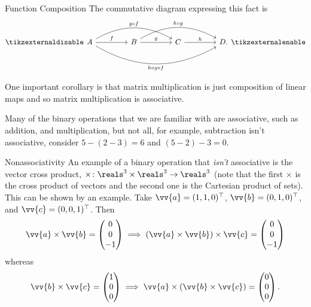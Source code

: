 \documentclass[fleqn]{NotesClass}
\newcommand*{\trans}{\top}
\begin{document}
\begin{exm}{Function Composition}{}
        The commutative diagram expressing this fact is
        \begin{equation}
            \tikzexternaldisable
            \begin{tikzcd}[column sep=1.5cm]
                A \ar[r, "f"] \ar[rr, "g \circ f", bend left] \ar[rrr, "h \circ g \circ f", bend right, swap] & B \ar[r, "g"] \ar[rr, "h \circ g", bend left] & C \ar[r, "h"] & D.
            \end{tikzcd}
            \tikzexternalenable
        \end{equation}
        
        One important corollary is that matrix multiplication is just composition of linear maps and so matrix multiplication is associative.
    \end{exm}
    
    Many of the binary operations that we are familiar with are associative, such as addition, and multiplication, but not all, for example, subtraction isn't associative, consider \(5 - (2 - 3) = 6\) and \((5 - 2) - 3 = 0\).
    
    \begin{exm}{Nonassociativity}{}
        An example of a binary operation that \emph{isn't} associative is the vector cross product, \(\times\colon\reals^3 \times \reals^3 \to \reals^3\) (note that the first \(\times\) is the cross product of vectors and the second one is the Cartesian product of sets).
        This can be shown by an example.
        Take \(\vv{a} = (1, 1, 0)^\trans\), \(\vv{b} = (0, 1, 0)^\trans\), and \(\vv{c} = (0, 0, 1)^\trans\).
        Then
        \begin{equation}
            \vv{a} \times \vv{b} = 
            \begin{pmatrix}
                0\\ 0\\ -1
            \end{pmatrix}
            \implies (\vv{a} \times \vv{b}) \times \vv{c} = 
            \begin{pmatrix}
                0\\ 0\\ -1
            \end{pmatrix}
        \end{equation}
        whereas
        \begin{equation}
            \vv{b} \times \vv{c} = 
            \begin{pmatrix}
                1\\ 0\\ 0
            \end{pmatrix}
            \implies \vv{a} \times (\vv{b} \times \vv{c}) = 
            \begin{pmatrix}
                0\\ 0\\ 0
            \end{pmatrix}
            .
        \end{equation}
    \end{exm}
    
\end{document}
